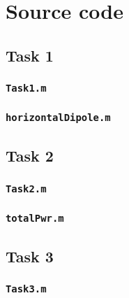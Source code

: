 \chapter{Source code}

\section{Task 1}
\label{section:task1.m}

\subsection{\texttt{Task1.m}}



\subsection{\texttt{horizontalDipole.m}}




\section{Task 2}
\label{section:task2.m}
\subsection{\texttt{Task2.m}}



\subsection{\texttt{totalPwr.m}}



\section{Task 3}
\label{section:task3.m}
\subsection{\texttt{Task3.m}}



